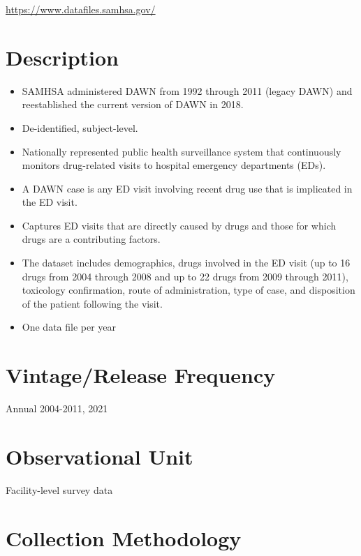 \documentclass[
]{book}
\providecommand{\tightlist}{%
  \setlength{\itemsep}{0pt}\setlength{\parskip}{0pt}}
\begin{document}
\url{https://www.datafiles.samhsa.gov/}

\hypertarget{description-24}{%
\section{Description}\label{description-24}}

\begin{itemize}
\tightlist
\item
  SAMHSA administered DAWN from 1992 through 2011 (legacy DAWN) and reestablished the current version of DAWN in 2018.
\item
  De-identified, subject-level.
\item
  Nationally represented public health surveillance system that continuously monitors drug-related visits to hospital emergency departments (EDs).
\item
  A DAWN case is any ED visit involving recent drug use that is implicated in the ED visit.
\item
  Captures ED visits that are directly caused by drugs and those for which drugs are a contributing factors.
\item
  The dataset includes demographics, drugs involved in the ED visit (up to 16 drugs from 2004 through 2008 and up to 22 drugs from 2009 through 2011), toxicology confirmation, route of administration, type of case, and disposition of the patient following the visit.
\item
  One data file per year
\end{itemize}

\hypertarget{vintagerelease-frequency-24}{%
\section{Vintage/Release Frequency}\label{vintagerelease-frequency-24}}

Annual 2004-2011, 2021

\hypertarget{observational-unit-24}{%
\section{Observational Unit}\label{observational-unit-24}}

Facility-level survey data

\hypertarget{collection-methodology-24}{%
\section{Collection Methodology}\label{collection-methodology-24}}
\end{document}
